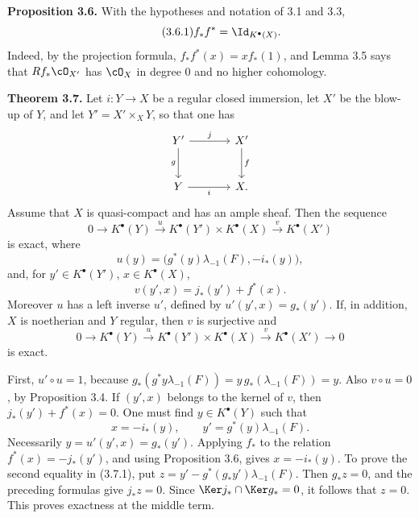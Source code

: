 \textbf{Proposition 3.6.} With the hypotheses and notation of 3.1 and 3.3,
\begin{equation}\tag{3.6.1}
f_*f^*=\Id_{K^\bullet(X)}.
\end{equation}
Indeed, by the projection formula, \(f_*f^*(x)=x f_*(1)\), and Lemma 3.5 says that \(Rf_*\cO_{X'}\) has \(\cO_X\) in degree \(0\) and no higher cohomology.

\textbf{Theorem 3.7.} Let \(i:Y\to X\) be a regular closed immersion, let \(X'\) be the blow-up of \(Y\), and let \(Y'=X'\times_XY\), so that one has
\[
\begin{tikzcd}[column sep=large,row sep=large]
Y' \arrow[r,"j"] \arrow[d,"g"'] & X' \arrow[d,"f"]\\
Y \arrow[r,"i"'] & X.
\end{tikzcd}
\]
Assume that \(X\) is quasi-compact and has an ample sheaf. Then the sequence
\begin{equation}\tag{3.7.0}
0\to K^\bullet(Y)\xrightarrow{u}K^\bullet(Y')\times K^\bullet(X)\xrightarrow{v}K^\bullet(X')
\end{equation}
is exact, where
\begin{equation}\tag{3.7.u}
u(y)=\bigl(g^*(y)\lambda_{-1}(F),-i_*(y)\bigr),
\end{equation}
and, for \(y'\in K^\bullet(Y')\), \(x\in K^\bullet(X)\),
\begin{equation}\tag{3.7.v}
v(y',x)=j_*(y')+f^*(x).
\end{equation}
Moreover \(u\) has a left inverse \(u'\), defined by \(u'(y',x)=g_*(y')\). If, in addition, \(X\) is noetherian and \(Y\) regular, then \(v\) is surjective and
\begin{equation}\tag{3.7.2}
0\to K^\bullet(Y)\xrightarrow{u}K^\bullet(Y')\times K^\bullet(X)\xrightarrow{v}K^\bullet(X')\to0
\end{equation}
is exact.

First, \(u'\circ u=1\), because \(g_*(g^*y\lambda_{-1}(F))=y\,g_*(\lambda_{-1}(F))=y\). Also \(v\circ u=0\), by Proposition 3.4. If \((y',x)\) belongs to the kernel of \(v\), then \(j_*(y')+f^*(x)=0\). One must find \(y\in K^\bullet(Y)\) such that
\begin{equation}\tag{3.7.1}
x=-i_*(y),\qquad y'=g^*(y)\lambda_{-1}(F).
\end{equation}
Necessarily \(y=u'(y',x)=g_*(y')\). Applying \(f_*\) to the relation \(f^*(x)=-j_*(y')\), and using Proposition 3.6, gives \(x=-i_*(y)\). To prove the second equality in (3.7.1), put \(z=y'-g^*(g_*y')\lambda_{-1}(F)\). Then \(g_*z=0\), and the preceding formulas give \(j_*z=0\). Since \(\Ker j_*\cap\Ker g_*=0\), it follows that \(z=0\). This proves exactness at the middle term.

